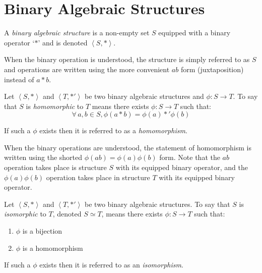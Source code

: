 \documentclass[letterpaper,12pt,fleqn]{article}
\newcommand{\bas}[2]{\left<#1,#2\right>}
\newcommand{\p}{\phi}
\begin{document}
\section*{Binary Algebraic Structures}

\begin{definition}
  A \emph{binary algebraic structure} is a non-empty set $S$ equipped with a
  binary operator `$*$' and is denoted $\bas{S}{*}$.
\end{definition}

When the binary operation is understood, the structure is simply referred to
as $S$ and operations are written using the more convenient $ab$ form
(juxtaposition) instead of $a*b$.

\begin{definition}
Let $\bas{S}{*}$ and $\bas{T}{*'}$ be two binary algebraic structures and
$\p:S\to T$. To say that $S$ is \emph{homomorphic} to $T$ means there exists
$\p:S\to T$ such that:
\[\forall\,a,b\in S,\p(a*b)=\p(a)*'\p(b)\]

If such a $\p$ exists then it is referred to as a \emph{homomorphism}.

When the binary operations are understood, the statement of homomorphism is
written using the shorted $\p(ab)=\p(a)\p(b)$ form. Note that the $ab$
operation takes place is structure $S$ with its equipped binary operator, and
the $\p(a)\p(b)$ operation takes place in structure $T$ with its equipped
binary operator.
\end{definition}

\begin{definition}
  Let $\bas{S}{*}$ and $\bas{T}{*'}$ be two binary algebraic structures. To say
  that $S$ is \emph{isomorphic} to $T$, denoted $S\simeq T$, means there exists
  $\p:S\to T$ such that:
  \begin{enumerate}
  \item $\p$ is a bijection
  \item $\p$ is a homomorphism
  \end{enumerate}
  If such a $\p$ exists then it is referred to as an \emph{isomorphism}.
\end{definition}
\end{document}
